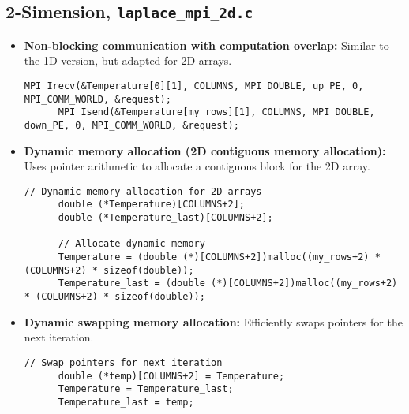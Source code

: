 \documentclass[11pt]{article}
\begin{document}
  \subsection{2-Simension, \texttt{laplace\_mpi\_2d.c}}
  \begin{itemize}
    \item \textbf{Non-blocking communication with computation overlap:} Similar to the 1D version, but adapted for 2D arrays.
    \begin{lstlisting}[style=dm4ds_lstCustom_01]
      MPI_Irecv(&Temperature[0][1], COLUMNS, MPI_DOUBLE, up_PE, 0, MPI_COMM_WORLD, &request);
      MPI_Isend(&Temperature[my_rows][1], COLUMNS, MPI_DOUBLE, down_PE, 0, MPI_COMM_WORLD, &request);
    \end{lstlisting}
    \item \textbf{Dynamic memory allocation (2D contiguous memory allocation):} Uses pointer arithmetic to allocate a contiguous block for the 2D array.
    \begin{lstlisting}[style=dm4ds_lstCustom_01]
      // Dynamic memory allocation for 2D arrays
      double (*Temperature)[COLUMNS+2];
      double (*Temperature_last)[COLUMNS+2];

      // Allocate dynamic memory
      Temperature = (double (*)[COLUMNS+2])malloc((my_rows+2) * (COLUMNS+2) * sizeof(double));
      Temperature_last = (double (*)[COLUMNS+2])malloc((my_rows+2) * (COLUMNS+2) * sizeof(double));
    \end{lstlisting}
    \item \textbf{Dynamic swapping memory allocation:} Efficiently swaps pointers for the next iteration.
    \begin{lstlisting}[style=dm4ds_lstCustom_01]
      // Swap pointers for next iteration
      double (*temp)[COLUMNS+2] = Temperature;
      Temperature = Temperature_last;
      Temperature_last = temp;
    \end{lstlisting}
  \end{itemize}
\end{document}
